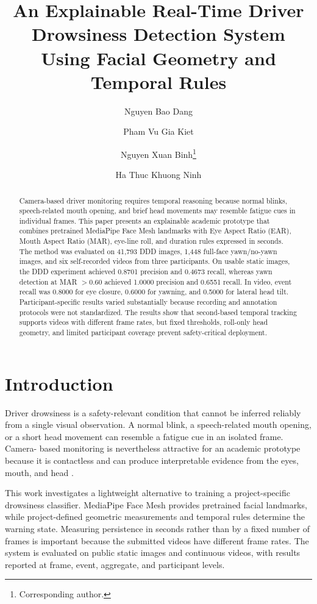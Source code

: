 \documentclass[runningheads]{llncs}
\title{An Explainable Real-Time Driver Drowsiness Detection System Using Facial Geometry and Temporal Rules}
\author{Nguyen Bao Dang \and
        Pham Vu Gia Kiet \and
        Nguyen Xuan Binh\thanks{Corresponding author.} \and
        Ha Thuc Khuong Ninh}
\institute{Department of Artificial Intelligence, FPT University,\\
Ho Chi Minh City, Vietnam\\
\email{ngxbinh9999@gmail.com}}
\begin{document}
\maketitle

\begin{abstract}
Camera-based driver monitoring requires temporal reasoning because normal blinks,
speech-related mouth opening, and brief head movements may resemble fatigue cues
in individual frames. This paper presents an explainable academic prototype that
combines pretrained MediaPipe Face Mesh landmarks with Eye Aspect Ratio (EAR),
Mouth Aspect Ratio (MAR), eye-line roll, and duration rules expressed in seconds.
The method was evaluated on 41,793 DDD images, 1,448 full-face yawn/no-yawn
images, and six self-recorded videos from three participants. On usable static
images, the DDD experiment achieved 0.8701 precision and 0.4673 recall, whereas
yawn detection at MAR $>0.60$ achieved 1.0000 precision and 0.6551 recall. In
video, event recall was 0.8000 for eye closure, 0.6000 for yawning, and 0.5000
for lateral head tilt. Participant-specific results varied substantially because
recording and annotation protocols were not standardized. The results show that
second-based temporal tracking supports videos with different frame rates, but
fixed thresholds, roll-only head geometry, and limited participant coverage
prevent safety-critical deployment.

\end{abstract}

\section{Introduction}

Driver drowsiness is a safety-relevant condition that cannot be inferred reliably
from a single visual observation. A normal blink, a speech-related mouth opening,
or a short head movement can resemble a fatigue cue in an isolated frame. Camera-
based monitoring is nevertheless attractive for an academic prototype because it
is contactless and can produce interpretable evidence from the eyes, mouth, and
head \cite{sahayadhas2012review}.

This work investigates a lightweight alternative to training a project-specific
drowsiness classifier. MediaPipe Face Mesh provides pretrained facial landmarks,
while project-defined geometric measurements and temporal rules determine the
warning state. Measuring persistence in seconds rather than by a fixed number of
frames is important because the submitted videos have different frame rates. The
system is evaluated on public static images and continuous videos, with results
reported at frame, event, aggregate, and participant levels.
\end{document}
